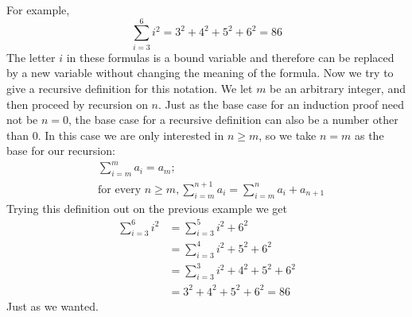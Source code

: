 \documentclass{report}
\theoremstyle{definition}
\begin{document}
For example,
\begin{equation*}
\sum^6_{i=3}i^2=3^2+4^2+5^2+6^2=86
\end{equation*}
The letter $i$ in these formulas is a bound variable and therefore can be replaced by a new variable without changing the meaning of the formula. 
Now we try to give a recursive definition for this notation. We let $m$ be an arbitrary integer, and then proceed by recursion on $n$. 
Just as the base case for an induction proof need not be $n=0$, the base case for a recursive definition can also be a number other than 0. In this case we are only interested in $n\geq m$, so we
take $n=m$ as the base for our recursion:
\begin{align*}
&\sum^m_{i=m}a_i=a_m;\\
&\text{for every }n\geq m,\sum^{n+1}_{i=m}a_i=\sum^{n}_{i=m}a_i+a_{n+1}
\end{align*}
Trying this definition out on the previous example we get
\begin{align*}
\sum^6_{i=3}i^2&=\sum^5_{i=3}i^2+6^2\\
&=\sum^4_{i=3}i^2+5^2+6^2\\
&=\sum^3_{i=3}i^2+4^2+5^2+6^2\\
&=3^2+4^2+5^2+6^2=86
\end{align*}
Just as we wanted.
\newpage
\end{document}
